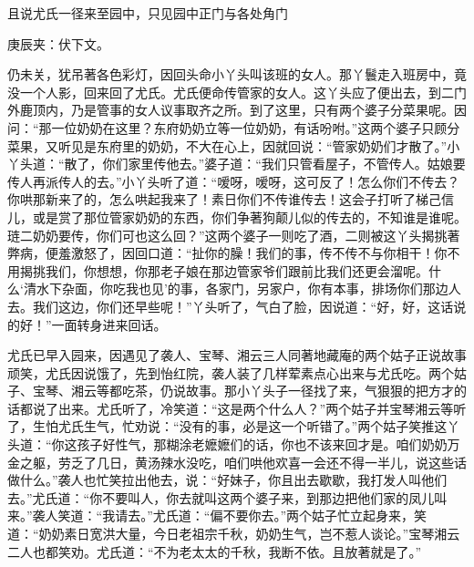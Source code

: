 \begin{parag}
    且说尤氏一径来至园中，只见园中正门与各处角门\begin{note}庚辰夹：伏下文。\end{note}仍未关，犹吊著各色彩灯，因回头命小丫头叫该班的女人。那丫鬟走入班房中，竟没一个人影，回来回了尤氏。尤氏便命传管家的女人。这丫头应了便出去，到二门外鹿顶内，乃是管事的女人议事取齐之所。到了这里，只有两个婆子分菜果呢。因问：“那一位奶奶在这里？东府奶奶立等一位奶奶，有话吩咐。”这两个婆子只顾分菜果，又听见是东府里的奶奶，不大在心上，因就回说：“管家奶奶们才散了。”小丫头道：“散了，你们家里传他去。”婆子道：“我们只管看屋子，不管传人。姑娘要传人再派传人的去。”小丫头听了道：“嗳呀，嗳呀，这可反了！怎么你们不传去？你哄那新来了的，怎么哄起我来了！素日你们不传谁传去！这会子打听了梯己信儿，或是赏了那位管家奶奶的东西，你们争著狗颠儿似的传去的，不知谁是谁呢。琏二奶奶要传，你们可也这么回？”这两个婆子一则吃了酒，二则被这丫头揭挑著弊病，便羞激怒了，因回口道：“扯你的臊！我们的事，传不传不与你相干！你不用揭挑我们，你想想，你那老子娘在那边管家爷们跟前比我们还更会溜呢。什么‘清水下杂面，你吃我也见’的事，各家门，另家户，你有本事，排场你们那边人去。我们这边，你们还早些呢！”丫头听了，气白了脸，因说道：“好，好，这话说的好！”一面转身进来回话。
\end{parag}


\begin{parag}
    尤氏已早入园来，因遇见了袭人、宝琴、湘云三人同著地藏庵的两个姑子正说故事顽笑，尤氏因说饿了，先到怡红院，袭人装了几样荤素点心出来与尤氏吃。两个姑子、宝琴、湘云等都吃茶，仍说故事。那小丫头子一径找了来，气狠狠的把方才的话都说了出来。尤氏听了，冷笑道：“这是两个什么人？”两个姑子并宝琴湘云等听了，生怕尤氏生气，忙劝说：“没有的事，必是这一个听错了。”两个姑子笑推这丫头道：“你这孩子好性气，那糊涂老嬷嬷们的话，你也不该来回才是。咱们奶奶万金之躯，劳乏了几日，黄汤辣水没吃，咱们哄他欢喜一会还不得一半儿，说这些话做什么。”袭人也忙笑拉出他去，说：“好妹子，你且出去歇歇，我打发人叫他们去。”尤氏道：“你不要叫人，你去就叫这两个婆子来，到那边把他们家的凤儿叫来。”袭人笑道：“我请去。”尤氏道：“偏不要你去。”两个姑子忙立起身来，笑道：“奶奶素日宽洪大量，今日老祖宗千秋，奶奶生气，岂不惹人谈论。”宝琴湘云二人也都笑劝。尤氏道：“不为老太太的千秋，我断不依。且放著就是了。”
\end{parag}


